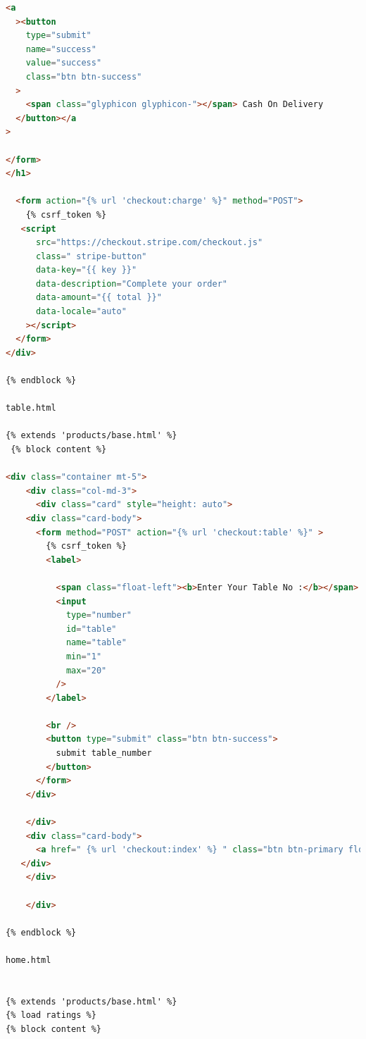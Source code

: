 \documentclass[12pt,a4paper]{report}
\begin{document}
\begin{appendices}
\begin{lstlisting}[language=HTML]
  <a 
  ><button
    type="submit"
    name="success"
    value="success"
    class="btn btn-success"
  >
    <span class="glyphicon glyphicon-"></span> Cash On Delivery
  </button></a
>

</form>
</h1>

  <form action="{% url 'checkout:charge' %}" method="POST">
    {% csrf_token %}
   <script
      src="https://checkout.stripe.com/checkout.js"
      class=" stripe-button"
      data-key="{{ key }}"
      data-description="Complete your order"
      data-amount="{{ total }}"
      data-locale="auto"
    ></script>
  </form>
</div>
 
{% endblock %}

table.html

{% extends 'products/base.html' %} 
 {% block content %}

<div class="container mt-5">
    <div class="col-md-3">
      <div class="card" style="height: auto">
    <div class="card-body">
      <form method="POST" action="{% url 'checkout:table' %}" >
        {% csrf_token %}
        <label>
    
          <span class="float-left"><b>Enter Your Table No :</b></span>
          <input
            type="number"
            id="table"
            name="table"
            min="1"
            max="20"
          />
        </label>
       
        <br />
        <button type="submit" class="btn btn-success">
          submit table_number
        </button>
      </form>
    </div>
    
    </div>
    <div class="card-body">
      <a href=" {% url 'checkout:index' %} " class="btn btn-primary float-right">Proceed to Checkout </a>
   </div>
    </div>
    
    </div>

{% endblock %}

home.html


{% extends 'products/base.html' %}
{% load ratings %}
{% block content %}


\end{lstlisting}
\end{appendices}
\end{document}
